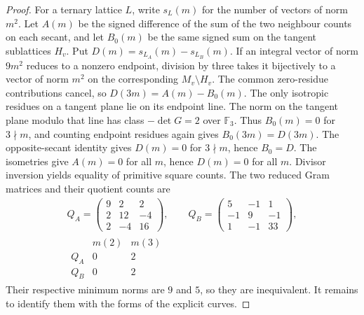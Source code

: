 \documentclass[11pt,letterpaper]{amsart}
\theoremstyle{definition}
\numberwithin{equation}{section}
\begin{document}
\begin{proof}
For a ternary lattice \(L\), write \(s_L(m)\) for the number of
vectors of norm \(m^2\). Let \(A(m)\) be the signed difference of the
sum of the two neighbour counts on each secant, and let \(B_0(m)\)
be the same signed sum on the tangent sublattices \(H_v\). Put
\(D(m)=s_{L_A}(m)-s_{L_B}(m)\). If an integral vector of norm
\(9m^2\) reduces to a nonzero endpoint, division by three takes it
bijectively to a vector of norm \(m^2\) on the corresponding
\(M_v\setminus H_v\). The common zero-residue contributions cancel,
so \(D(3m)=A(m)-B_0(m)\). The only isotropic residues on a tangent
plane lie on its endpoint line. The norm on the tangent plane
modulo that line has class \(-\det G=2\) over \(\mathbb F_3\).
Thus \(B_0(m)=0\) for \(3\nmid m\), and counting endpoint residues
again gives \(B_0(3m)=D(3m)\). The opposite-secant identity gives
\(D(m)=0\) for \(3\nmid m\), hence \(B_0=D\). The isometries give
\(A(m)=0\) for all \(m\), hence \(D(m)=0\) for all \(m\).
Divisor inversion yields equality of primitive square counts.
The two reduced Gram matrices and their quotient counts are
\[
 \begin{gathered}
 Q_A=\begin{pmatrix}9&2&2\\2&12&-4\\2&-4&16\end{pmatrix},\qquad
 Q_B=\begin{pmatrix}5&-1&1\\-1&9&-1\\1&-1&33\end{pmatrix},\\
 \begin{array}{c|cc}
       &m(2)&m(3)\\ \hline
  Q_A&0&2\\
  Q_B&0&2
 \end{array}
 \end{gathered}
\]
Their respective minimum norms are \(9\) and \(5\), so they are
inequivalent. It remains to identify them with the forms of the
explicit curves.


\end{proof}
\end{document}
